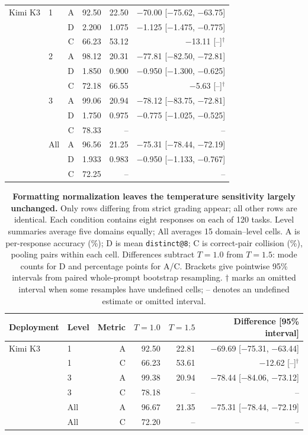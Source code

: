 \begin{table}[!htbp]
\begin{tabular}{@{}llrrrr@{}}
    \midrule
    Kimi K3 & 1 & A & 92.50 & 22.50 & $-$70.00 [$-$75.62, $-$63.75] \\
     &  & D & 2.200 & 1.075 & $-$1.125 [$-$1.475, $-$0.775] \\
     &  & C & 66.23 & 53.12 & $-$13.11 [--]$^\dagger$ \\
     & 2 & A & 98.12 & 20.31 & $-$77.81 [$-$82.50, $-$72.81] \\
     &  & D & 1.850 & 0.900 & $-$0.950 [$-$1.300, $-$0.625] \\
     &  & C & 72.18 & 66.55 & $-$5.63 [--]$^\dagger$ \\
     & 3 & A & 99.06 & 20.94 & $-$78.12 [$-$83.75, $-$72.81] \\
     &  & D & 1.750 & 0.975 & $-$0.775 [$-$1.025, $-$0.525] \\
     &  & C & 78.33 & -- & -- \\
     & All & A & 96.56 & 21.25 & $-$75.31 [$-$78.44, $-$72.19] \\
     &  & D & 1.933 & 0.983 & $-$0.950 [$-$1.133, $-$0.767] \\
     &  & C & 72.25 & -- & -- \\
    \bottomrule
  \end{tabular}
\end{table}

\begin{table}[!htbp]
  \centering
  \setlength{\parfillskip}{0pt plus .20\linewidth}
  \caption{\textbf{Formatting normalization leaves the temperature sensitivity largely unchanged.} Only rows differing from strict grading appear; all other rows are identical.
  Each condition contains eight responses on each of 120 tasks.
  Level summaries average five domains equally; All averages 15 domain--level cells.
  A is per-response accuracy (\%); D is mean \texttt{distinct@8};
  C is correct-pair collision (\%), pooling pairs within each cell.
  Differences subtract $T=1.0$ from $T=1.5$: mode counts for D and percentage points for A/C.
  Brackets give pointwise 95\% intervals from paired whole-prompt bootstrap resampling.
  $\dagger$ marks an omitted interval when some resamples have undefined cells;
  -- denotes an undefined estimate or omitted interval.}
  \small
  \setlength{\tabcolsep}{5pt}
  \begin{tabular}{@{}llrrrr@{}}
    \toprule
    Deployment & Level & Metric & $T=1.0$ & $T=1.5$ & Difference [95\% interval] \\
    \midrule
    Kimi K3 & 1 & A & 92.50 & 22.81 & $-$69.69 [$-$75.31, $-$63.44] \\
     & 1 & C & 66.23 & 53.61 & $-$12.62 [--]$^\dagger$ \\
     & 3 & A & 99.38 & 20.94 & $-$78.44 [$-$84.06, $-$73.12] \\
     & 3 & C & 78.18 & -- & -- \\
     & All & A & 96.67 & 21.35 & $-$75.31 [$-$78.44, $-$72.19] \\
     & All & C & 72.20 & -- & -- \\
    \bottomrule
  \end{tabular}
\end{table}

